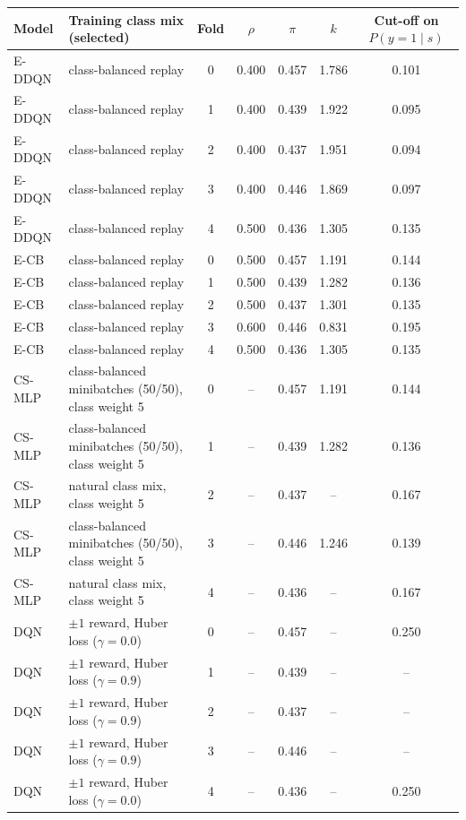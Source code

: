 \begin{tabular}{llccccc}
\toprule
Model & Training class mix (selected) & Fold & $\rho$ & $\pi$ & $k$ & Cut-off on $P(y=1\mid s)$ \\
\midrule
E-DDQN & class-balanced replay & 0 & 0.400 & 0.457 & 1.786 & 0.101 \\
E-DDQN & class-balanced replay & 1 & 0.400 & 0.439 & 1.922 & 0.095 \\
E-DDQN & class-balanced replay & 2 & 0.400 & 0.437 & 1.951 & 0.094 \\
E-DDQN & class-balanced replay & 3 & 0.400 & 0.446 & 1.869 & 0.097 \\
E-DDQN & class-balanced replay & 4 & 0.500 & 0.436 & 1.305 & 0.135 \\
\midrule
E-CB & class-balanced replay & 0 & 0.500 & 0.457 & 1.191 & 0.144 \\
E-CB & class-balanced replay & 1 & 0.500 & 0.439 & 1.282 & 0.136 \\
E-CB & class-balanced replay & 2 & 0.500 & 0.437 & 1.301 & 0.135 \\
E-CB & class-balanced replay & 3 & 0.600 & 0.446 & 0.831 & 0.195 \\
E-CB & class-balanced replay & 4 & 0.500 & 0.436 & 1.305 & 0.135 \\
\midrule
CS-MLP & class-balanced minibatches (50/50), class weight 5 & 0 & -- & 0.457 & 1.191 & 0.144 \\
CS-MLP & class-balanced minibatches (50/50), class weight 5 & 1 & -- & 0.439 & 1.282 & 0.136 \\
CS-MLP & natural class mix, class weight 5 & 2 & -- & 0.437 & -- & 0.167 \\
CS-MLP & class-balanced minibatches (50/50), class weight 5 & 3 & -- & 0.446 & 1.246 & 0.139 \\
CS-MLP & natural class mix, class weight 5 & 4 & -- & 0.436 & -- & 0.167 \\
\midrule
DQN & $\pm1$ reward, Huber loss ($\gamma=0.0$) & 0 & -- & 0.457 & -- & 0.250 \\
DQN & $\pm1$ reward, Huber loss ($\gamma=0.9$) & 1 & -- & 0.439 & -- & -- \\
DQN & $\pm1$ reward, Huber loss ($\gamma=0.9$) & 2 & -- & 0.437 & -- & -- \\
DQN & $\pm1$ reward, Huber loss ($\gamma=0.9$) & 3 & -- & 0.446 & -- & -- \\
DQN & $\pm1$ reward, Huber loss ($\gamma=0.0$) & 4 & -- & 0.436 & -- & 0.250 \\
\bottomrule
\end{tabular}
